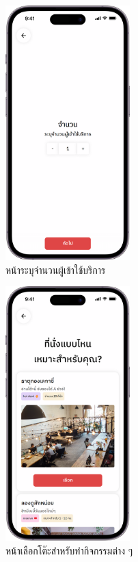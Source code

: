 \begin{figure}[ht]
    \begin{center}
    \includegraphics[width=1.9in]{./image/Flowy_book_ctm_amt.png}
    \end{center}
    \caption[Flowy booking customer amount]{หน้าระบุจำนวนผู้เข้าใช้บริการ}
    \label{fig:Flowy_book_ctm_amt}
\end{figure}
\begin{figure}[ht]
    \begin{center}
    \includegraphics[width=1.9in]{./image/Flowy_book_desk.png}
    \end{center}
    \caption[Flowy booking desk]{หน้าเลือกโต๊ะสำหรับทำกิจกรรมต่าง ๆ}
    \label{fig:Flowy_book_desk}
\end{figure}

